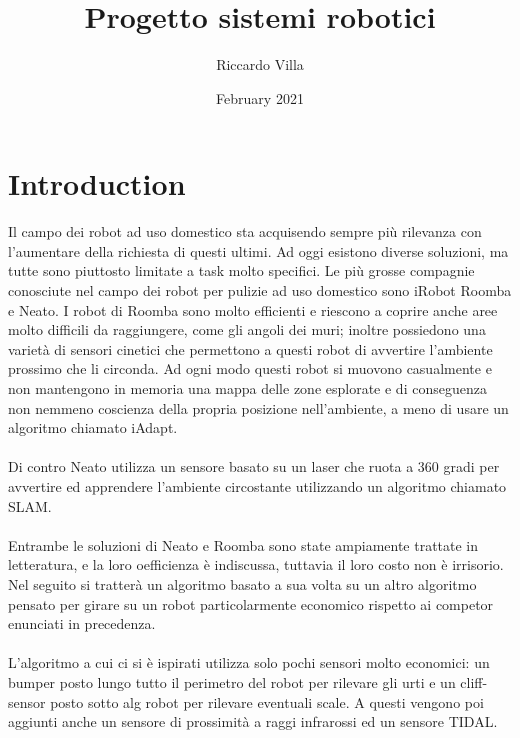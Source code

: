 \documentclass{article}
\title{Progetto sistemi robotici}
\author{Riccardo Villa}
\date{February 2021}
\begin{document}
\maketitle

\section{Introduction}

Il campo dei robot ad uso domestico sta acquisendo sempre più rilevanza con l'aumentare della richiesta di questi ultimi. Ad oggi esistono diverse soluzioni, ma tutte sono piuttosto limitate a task molto specifici.
Le più grosse compagnie conosciute nel campo dei robot per pulizie ad uso domestico sono iRobot Roomba e Neato. I robot di Roomba sono molto efficienti e riescono a coprire anche aree molto difficili da raggiungere, come gli angoli dei muri; inoltre possiedono una varietà di sensori cinetici che permettono a questi robot di avvertire l'ambiente prossimo che li circonda. Ad ogni modo questi robot si muovono casualmente e non mantengono in memoria una mappa delle zone esplorate e di conseguenza non nemmeno coscienza della propria posizione nell'ambiente, a meno di usare un algoritmo chiamato iAdapt.
\paragraph{}
Di contro Neato utilizza un sensore basato su un laser che ruota a 360 gradi per avvertire ed apprendere l'ambiente circostante utilizzando un algoritmo chiamato SLAM.
\paragraph{}
Entrambe le soluzioni di Neato e Roomba sono state ampiamente trattate in letteratura, e la loro oefficienza è indiscussa, tuttavia il loro costo non è irrisorio. Nel seguito si tratterà un algoritmo basato a sua volta su un altro algoritmo pensato per girare su un robot particolarmente economico rispetto ai competor enunciati in precedenza.

\paragraph{}
L'algoritmo a cui ci si è ispirati utilizza solo pochi sensori molto economici: un bumper posto lungo tutto il perimetro del robot per rilevare gli urti e un cliff-sensor posto sotto alg robot per rilevare eventuali scale. A questi vengono poi aggiunti anche un sensore di prossimità a raggi infrarossi ed un sensore TIDAL.
\end{document}
